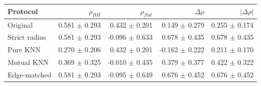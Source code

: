 \begin{tabular}{l r r r r}
\toprule
Protocol & $\rho_{BH}$ & $\rho_{flat}$ & $\Delta\rho$ & $|\Delta\rho|$ \\
\midrule
Original & 0.581 $\pm$ 0.293 & 0.432 $\pm$ 0.201 & 0.149 $\pm$ 0.279 & 0.255 $\pm$ 0.174 \\
Strict radius & 0.581 $\pm$ 0.293 & -0.096 $\pm$ 0.633 & 0.678 $\pm$ 0.435 & 0.678 $\pm$ 0.435 \\
Pure KNN & 0.270 $\pm$ 0.206 & 0.432 $\pm$ 0.201 & -0.162 $\pm$ 0.222 & 0.211 $\pm$ 0.170 \\
Mutual KNN & 0.369 $\pm$ 0.325 & -0.010 $\pm$ 0.435 & 0.379 $\pm$ 0.377 & 0.422 $\pm$ 0.322 \\
Edge-matched & 0.581 $\pm$ 0.293 & -0.095 $\pm$ 0.649 & 0.676 $\pm$ 0.452 & 0.676 $\pm$ 0.452 \\
\bottomrule
\end{tabular}
